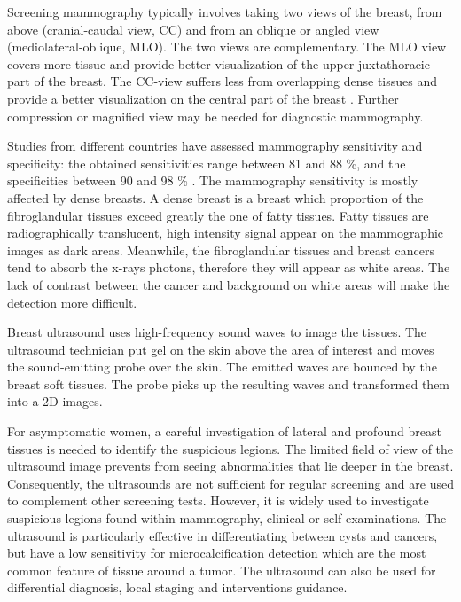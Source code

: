 Screening mammography typically involves taking two views of the breast, from above (cranial-caudal view, CC) and from an oblique or angled view (mediolateral-oblique, MLO). The two views are complementary. The MLO view covers more tissue and provide better visualization of the upper juxtathoracic part of the breast. The CC-view suffers less from overlapping dense tissues and provide a better visualization on the central part of the breast \citep{chan_image_1987}.  Further compression or magnified view may be needed for diagnostic mammography.
 
Studies from different countries have assessed mammography sensitivity and specificity: the obtained sensitivities range between 81 and 88 \%, and the specificities between 90 and 98 \% \citep{kemp_comparing_2015,hofvind_sensitivity_2012}. The mammography sensitivity is mostly affected by dense breasts. A dense breast is a breast which proportion of the fibroglandular tissues exceed greatly the one of fatty tissues. Fatty tissues are radiographically translucent, high intensity signal appear on the mammographic images as dark areas. Meanwhile, the fibroglandular tissues and breast cancers tend to absorb the x-rays photons, therefore they will appear as white areas. The lack of contrast between the cancer and background on white areas will make the detection more difficult.      
 


Breast ultrasound uses high-frequency sound waves to image the tissues. The ultrasound technician put gel on the skin above the area of interest and moves the sound-emitting probe over the skin. The emitted waves are bounced by the breast soft tissues. The probe picks up the resulting waves and transformed them into a 2D images. 

For asymptomatic women, a careful investigation of lateral and profound breast tissues is needed to identify the suspicious legions. The limited field of view of the ultrasound image prevents from seeing abnormalities that lie deeper in the breast. Consequently, the ultrasounds are not sufficient for regular screening and are used to complement other screening tests. However, it is widely used to investigate suspicious legions found within mammography, clinical or self-examinations. The ultrasound is particularly effective in differentiating between cysts and cancers, but have a low sensitivity for microcalcification detection which are the most common feature of tissue around a tumor.
The ultrasound can also be used for differential diagnosis, local staging and interventions guidance.

